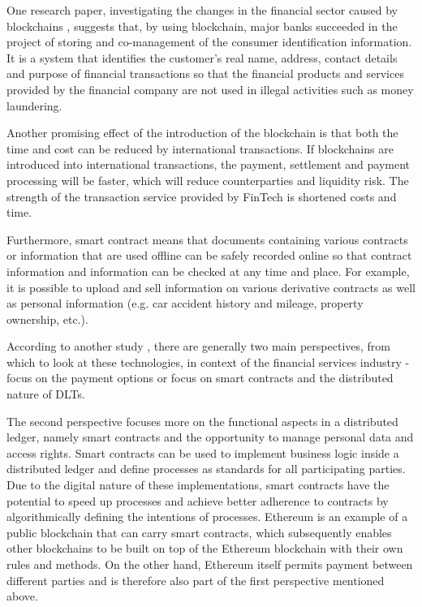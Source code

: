 One research paper, investigating the changes in the financial sector caused by blockchains \cite{yoo2017blockchain}, suggests that, by using blockchain, major banks succeeded in the project of storing and co-management of the consumer identification information. It is a system that identifies the customer’s real name, address, contact details and purpose of financial transactions so that the financial products and services provided by the financial company are not used in illegal activities such as money laundering.

Another promising effect of the introduction of the blockchain is that both the time and cost can be reduced by international transactions. If blockchains are introduced into international transactions, the payment, settlement and payment processing will be faster, which will reduce counterparties and liquidity risk. The strength of the transaction service provided by FinTech is shortened costs and time. 

Furthermore, smart contract means that documents containing various contracts or information that are used offline can be safely recorded online so that contract information and information can be checked at any time and place. For example, it is possible to upload and sell information on various derivative contracts as well as personal information (e.g. car accident history and mileage, property ownership, etc.).

According to another study \cite{bettio2019hyperledger}, there are generally two main perspectives, from which to look at these technologies, in context of the financial services industry - focus on the payment options or focus on smart contracts and the distributed nature of DLTs.

The second perspective focuses more on the functional aspects in a distributed ledger, namely smart contracts and the opportunity to manage personal data and access rights. Smart contracts can be used to implement business logic inside a distributed ledger and define processes as standards for all participating parties. Due to the digital nature of these implementations, smart contracts have the potential to speed up processes and achieve better adherence to contracts by algorithmically defining the intentions of processes. Ethereum is an example of a public blockchain that can carry smart contracts, which subsequently enables other blockchains to be built on top of the Ethereum blockchain with their own rules and methods. On the other hand, Ethereum itself permits payment between different parties and is therefore also part of the first perspective mentioned above.

